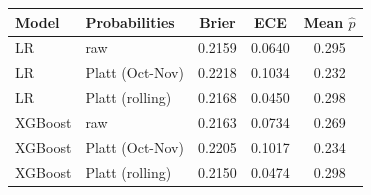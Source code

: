 \begin{tabular}{llccc}
\toprule
Model & Probabilities & Brier & ECE & Mean $\hat p$ \\
\midrule
LR & raw & 0.2159 & 0.0640 & 0.295 \\
LR & Platt (Oct-Nov) & 0.2218 & 0.1034 & 0.232 \\
LR & Platt (rolling) & 0.2168 & 0.0450 & 0.298 \\
XGBoost & raw & 0.2163 & 0.0734 & 0.269 \\
XGBoost & Platt (Oct-Nov) & 0.2205 & 0.1017 & 0.234 \\
XGBoost & Platt (rolling) & 0.2150 & 0.0474 & 0.298 \\
\bottomrule
\end{tabular}
